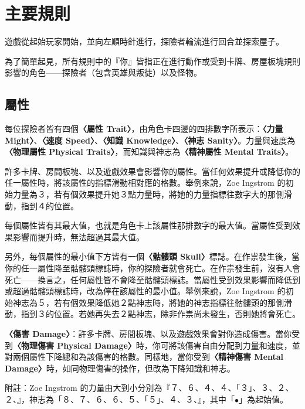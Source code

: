 
\section{主要規則} \label{sec:main}

遊戲從起始玩家開始，並向左順時針進行，探險者輪流進行回合並探索屋子。

為了簡單起見，所有規則中的『你』皆指正在進行動作或受到卡牌、房屋板塊規則影響的角色——探險者（包含英雄與叛徒）以及怪物。


\subsection{屬性} \label{ssec:traits}

每位探險者皆有四個\textbf{〈屬性 Trait〉}，由角色卡四邊的四排數字所表示：\textbf{〈力量 Might〉}、\textbf{〈速度 Speed〉}、\textbf{〈知識 Knowledge〉}、\textbf{〈神志 Sanity〉}。力量與速度為\textbf{〈物理屬性 Physical Traits〉}，而知識與神志為\textbf{〈精神屬性 Mental Traits〉}。

許多卡牌、房間板塊、以及遊戲效果會影響你的屬性。當任何效果提升或降低你的任一屬性時，將該屬性的指標滑動相對應的格數。舉例來說，Zoe Ingstrom 的初始力量為３，若有個效果提升她３點力量時，將她的力量指標往數字大的那側滑動，指到４的位置。

每個屬性皆有其最大值，也就是角色卡上該屬性那排數字的最大值。當屬性受到效果影響而提升時，無法超過其最大值。

另外，每個屬性的最小值下方皆有一個\textbf{〈骷髏頭 Skull〉}\SkullSymbol{}標誌。在作祟發生後，當你的任一屬性降至骷髏頭標誌時，你的探險者就會死亡。在作祟發生前，沒有人會死亡——換言之，任何屬性皆不會降至骷髏頭標誌。當屬性受到效果影響而降低到或超過骷髏頭標誌時，改為停在該屬性的最小值。舉例來說，Zoe Ingstrom 的初始神志為５，若有個效果降低她２點神志時，將她的神志指標往骷髏頭的那側滑動，指到３的位置。若她再失去２點神志，除非作祟尚未發生，否則她將會死亡。

\textbf{〈傷害 Damage〉}：許多卡牌、房間板塊、以及遊戲效果會對你造成傷害。當你受到\textbf{〈物理傷害 Physical Damage〉}時，你可將該傷害自由分配到力量和速度，並對兩個屬性下降總和為該傷害的格數。同樣地，當你受到\textbf{〈精神傷害 Mental Damage〉}時，如同物理傷害的操作，但改為下降知識和神志。

附註：Zoe Ingstrom 的力量由大到小分別為『７、６、４、４、\textcolor{green!50!black}{「３」}、３、２、２、\SkullSymbol{}』，神志為「８、７、６、６、５、\textcolor{green!50!black}{「５」}、４、３、\SkullSymbol{}』，其中「$\bullet$」為起始值。

